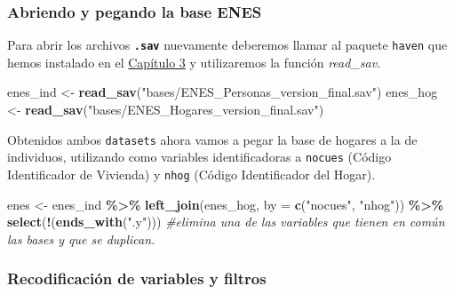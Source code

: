 \documentclass[
]{article}
\newenvironment{Shaded}{\begin{snugshade}}{\end{snugshade}}
\newcommand{\AttributeTok}[1]{\textcolor[rgb]{0.13,0.29,0.53}{#1}}
\newcommand{\CommentTok}[1]{\textcolor[rgb]{0.56,0.35,0.01}{\textit{#1}}}
\newcommand{\FunctionTok}[1]{\textcolor[rgb]{0.13,0.29,0.53}{\textbf{#1}}}
\newcommand{\NormalTok}[1]{#1}
\newcommand{\OtherTok}[1]{\textcolor[rgb]{0.56,0.35,0.01}{#1}}
\newcommand{\SpecialCharTok}[1]{\textcolor[rgb]{0.81,0.36,0.00}{\textbf{#1}}}
\newcommand{\StringTok}[1]{\textcolor[rgb]{0.31,0.60,0.02}{#1}}
\begin{document}
\hypertarget{abriendo-y-pegando-la-base-enes}{%
\subsubsection{Abriendo y pegando la base ENES}\label{abriendo-y-pegando-la-base-enes}}

Para abrir los archivos \textbf{\texttt{.sav}} nuevamente deberemos llamar al paquete \texttt{haven} que hemos instalado en el \protect\hyperlink{eph2}{Capítulo 3} y utilizaremos la función \emph{read\_sav}.

\begin{Shaded}
\begin{Highlighting}[]
\NormalTok{enes\_ind }\OtherTok{\textless{}{-}} \FunctionTok{read\_sav}\NormalTok{(}\StringTok{"bases/ENES\_Personas\_version\_final.sav"}\NormalTok{)}
\NormalTok{enes\_hog }\OtherTok{\textless{}{-}} \FunctionTok{read\_sav}\NormalTok{(}\StringTok{"bases/ENES\_Hogares\_version\_final.sav"}\NormalTok{)}
\end{Highlighting}
\end{Shaded}

Obtenidos ambos \texttt{datasets} ahora vamos a pegar la base de hogares a la de individuos, utilizando como variables identificadoras a \texttt{nocues} (Código Identificador de Vivienda) y \texttt{nhog} (Código Identificador del Hogar).

\begin{Shaded}
\begin{Highlighting}[]
\NormalTok{enes }\OtherTok{\textless{}{-}}\NormalTok{ enes\_ind }\SpecialCharTok{\%\textgreater{}\%}
    \FunctionTok{left\_join}\NormalTok{(enes\_hog, }\AttributeTok{by =} \FunctionTok{c}\NormalTok{(}\StringTok{"nocues"}\NormalTok{, }\StringTok{"nhog"}\NormalTok{)) }\SpecialCharTok{\%\textgreater{}\%}
    \FunctionTok{select}\NormalTok{(}\SpecialCharTok{!}\NormalTok{(}\FunctionTok{ends\_with}\NormalTok{(}\StringTok{".y"}\NormalTok{)))  }\CommentTok{\#elimina una de las variables que tienen en común las bases y que se duplican.}
\end{Highlighting}
\end{Shaded}

\hypertarget{recodificaciuxf3n-de-variables-y-filtros}{%
\subsubsection{Recodificación de variables y filtros}\label{recodificaciuxf3n-de-variables-y-filtros}}
\end{document}
